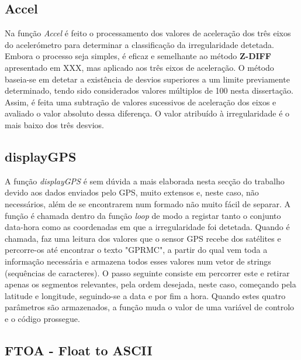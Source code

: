 \subsection{Accel}
\label{sub:accel}

Na função \emph{Accel} é feito o processamento dos valores de aceleração dos três eixos do acelerómetro para determinar a classificação da irregularidade detetada.
Embora o processo seja simples, é eficaz e semelhante ao método \textbf{Z-DIFF} apresentado em XXX, mas aplicado aos três eixos de aceleração.
O método baseia-se em detetar a existência de desvios superiores a um limite previamente determinado, tendo sido considerados valores múltiplos de 100 nesta dissertação.
Assim, é feita uma subtração de valores sucessivos de aceleração dos eixos e avaliado o valor absoluto dessa diferença.
O valor atribuído à irregularidade é o mais baixo dos três desvios.

\subsection{displayGPS}
\label{sub:displayGPS}

A função \emph{displayGPS} é sem dúvida a mais elaborada nesta secção do trabalho devido aos dados enviados pelo GPS, muito extensos e, neste caso, não necessários, além de se encontrarem num formado não muito fácil de separar.
A função é chamada dentro da função \emph{loop} de modo a registar tanto o conjunto data-hora como as coordenadas em que a irregularidade foi detetada.
Quando é chamada, faz uma leitura dos valores que o sensor GPS recebe dos satélites e percorre-os até encontrar o texto "GPRMC", a partir do qual vem toda a informação necessária e armazena todos esses valores num vetor de strings (sequências de caracteres).
O passo seguinte consiste em percorrer este  e retirar apenas os segmentos relevantes, pela ordem desejada, neste caso, começando pela latitude e longitude, seguindo-se a data e por fim a hora.
Quando estes quatro parâmetros são armazenados, a função muda o valor de uma variável de controlo e o código prossegue.

\subsection{FTOA - Float to ASCII}
\label{sub:FTOA}

